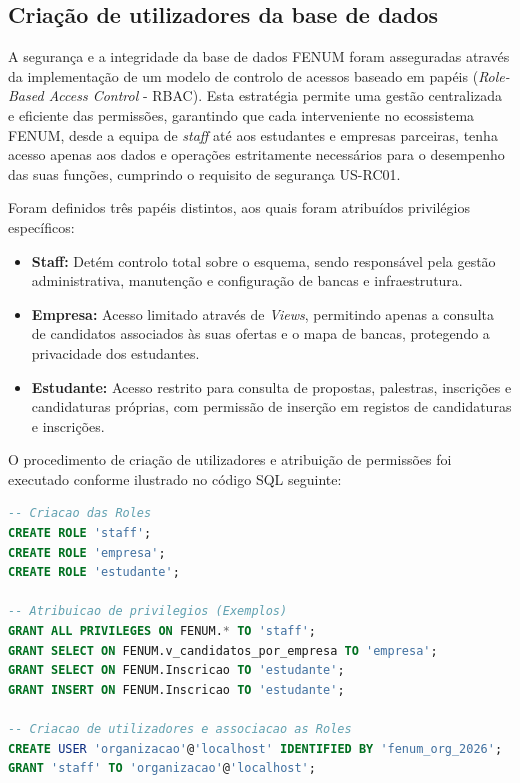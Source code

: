 \documentclass[12pt,a4paper]{article}
\begin{document}
\subsection{Criação de utilizadores da base de dados}

A segurança e a integridade da base de dados FENUM foram asseguradas através da
implementação de um modelo de controlo de acessos baseado em papéis
(\textit{Role-Based Access Control} - RBAC). Esta estratégia permite uma gestão
centralizada e eficiente das permissões, garantindo que cada interveniente no
ecossistema FENUM, desde a equipa de \textit{staff} até aos estudantes e
empresas parceiras, tenha acesso apenas aos dados e operações estritamente
necessários para o desempenho das suas funções, cumprindo o requisito de
segurança US-RC01.

Foram definidos três papéis distintos, aos quais foram atribuídos privilégios
específicos:

\begin{itemize}
    \item \textbf{Staff:} Detém controlo total sobre o esquema, sendo
    responsável pela gestão administrativa, manutenção e configuração de bancas
    e infraestrutura.
    \item \textbf{Empresa:} Acesso limitado através de \textit{Views},
    permitindo apenas a consulta de candidatos associados às suas ofertas e o
    mapa de bancas, protegendo a privacidade dos estudantes.
    \item \textbf{Estudante:} Acesso restrito para consulta de propostas,
    palestras, inscrições e candidaturas próprias, com permissão de inserção
    em registos de candidaturas e inscrições.
\end{itemize}

O procedimento de criação de utilizadores e atribuição de permissões foi
executado conforme ilustrado no código SQL seguinte:

\begin{lstlisting}[language=SQL, caption={Configuração de Roles e Utilizadores}, label={lst:roles}]
-- Criacao das Roles
CREATE ROLE 'staff';
CREATE ROLE 'empresa';
CREATE ROLE 'estudante';

-- Atribuicao de privilegios (Exemplos)
GRANT ALL PRIVILEGES ON FENUM.* TO 'staff';
GRANT SELECT ON FENUM.v_candidatos_por_empresa TO 'empresa';
GRANT SELECT ON FENUM.Inscricao TO 'estudante';
GRANT INSERT ON FENUM.Inscricao TO 'estudante';

-- Criacao de utilizadores e associacao as Roles
CREATE USER 'organizacao'@'localhost' IDENTIFIED BY 'fenum_org_2026';
GRANT 'staff' TO 'organizacao'@'localhost';
\end{lstlisting}
\end{document}
